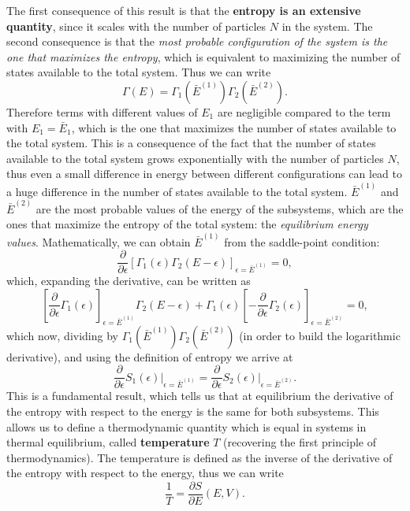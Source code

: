 The first consequence of this result is that the \textbf{entropy is an extensive quantity}, since it scales with the number of particles \(N\) in the system. The second consequence is that the \textit{most probable configuration of the system is the one that maximizes the entropy}, which is equivalent to maximizing the number of states available to the total system. Thus we can write
\[
    \Gamma(E) = \Gamma_1(\bar{E}^{(1)}) \Gamma_2(\bar{E}^{(2)}).
\]
Therefore terms with different values of \(E_1\) are negligible compared to the term with \(E_1 = \bar{E}_1\), which is the one that maximizes the number of states available to the total system. This is a consequence of the fact that the number of states available to the total system grows exponentially with the number of particles \(N\), thus even a small difference in energy between different configurations can lead to a huge difference in the number of states available to the total system. \(\bar{E}^{(1)}\) and \(\bar{E}^{(2)}\) are the most probable values of the energy of the subsystems, which are the ones that maximize the entropy of the total system: the \textit{equilibrium energy values}. Mathematically, we can obtain \(\bar{E}^{(1)}\) from the saddle-point condition:
\[
    \frac{\partial}{\partial \epsilon} \left[ \Gamma_1(\epsilon) \Gamma_2(E - \epsilon) \right]_{\epsilon = \bar{E}^{(1)}} = 0,
\]
which, expanding the derivative, can be written as
\[
    \left[ \frac{\partial}{\partial \epsilon} \Gamma_1(\epsilon) \right]_{\epsilon = \bar{E}^{(1)}} \Gamma_2(E - \epsilon) + \Gamma_1(\epsilon) \left[ - \frac{\partial}{\partial \epsilon} \Gamma_2(\epsilon) \right]_{\epsilon = \bar{E}^{(2)}} = 0,
\]
which now, dividing by \(\Gamma_1(\bar{E}^{(1)}) \Gamma_2(\bar{E}^{(2)})\) (in order to build the logarithmic derivative), and using the definition of entropy we arrive at
\[
    \frac{\partial}{\partial \epsilon} S_1 (\epsilon) \bigg|_{\epsilon = \bar{E}^{(1)}} = \frac{\partial}{\partial \epsilon} S_2(\epsilon) \bigg|_{\epsilon = \bar{E}^{(2)}}.
\]
This is a fundamental result, which tells us that at equilibrium the derivative of the entropy with respect to the energy is the same for both subsystems. This allows us to define a thermodynamic quantity which is equal in systems in thermal equilibrium, called \textbf{temperature} \(T\) (recovering the first principle of thermodynamics). The temperature is defined as the inverse of the derivative of the entropy with respect to the energy, thus we can write
\begin{equation}
    \frac{1}{T} = \frac{\partial S}{\partial E}(E, V).
    \label{eq:temperature_definition}
\end{equation}

